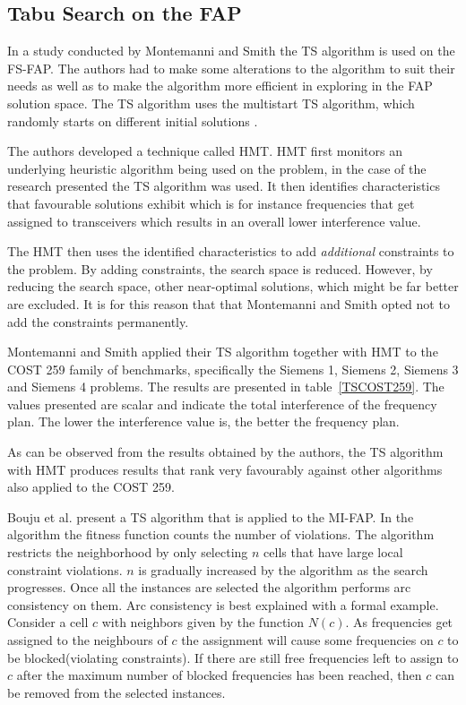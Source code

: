 \subsection{Tabu Search on the \gls{FAP}}
\label{sec:tabuonfap}
In a study conducted by Montemanni and Smith \cite{TabuMontemanniSmith} the \gls{TS} algorithm is used on the \gls{FS-FAP}. The authors had to make some alterations to the algorithm to suit their needs as well as to make the algorithm more efficient in exploring in the \gls{FAP} solution space. The \gls{TS} algorithm uses the multistart \gls{TS} algorithm, which randomly starts on different initial solutions \cite{TabuMontemanniSmith}.

The authors developed a technique called \gls{HMT}. \Gls{HMT} first monitors an underlying heuristic algorithm being used on the problem, in the case of the research presented the \gls{TS} algorithm was used\cite{TabuMontemanniSmith}. It then identifies characteristics that favourable solutions exhibit which is for instance frequencies that get assigned to transceivers which results in an overall lower interference value\cite{TabuMontemanniSmith}.

The \gls{HMT} then uses the identified characteristics to add \emph{additional} constraints to the problem\cite{TabuMontemanniSmith}. By adding constraints, the search space is reduced. However, by reducing the search space, other near-optimal solutions, which might be far better are excluded\cite{TabuMontemanniSmith}. It is for this reason that that Montemanni and Smith opted not to add the constraints permanently.

Montemanni and Smith applied their \gls{TS} algorithm together with \gls{HMT} to the \gls{COST} 259 family of benchmarks, specifically the Siemens 1, Siemens 2, Siemens 3 and Siemens 4 problems. The results are presented in table~\ref{TSCOST259}. The values presented are scalar and indicate the total interference of the frequency plan. The lower the interference value is, the better the frequency plan.

As can be observed from the results obtained by the authors, the \gls{TS} algorithm with HMT produces results that rank very favourably against other algorithms also applied to the \gls{COST} 259. 

Bouju et al. \cite{TSBouju} present a TS algorithm that is applied to the MI-FAP. In the algorithm the fitness function counts the number of violations. The algorithm restricts the neighborhood by only selecting $n$ cells that have large local constraint violations. $n$ is gradually increased by the algorithm as the search progresses. Once all the instances are selected the algorithm performs arc consistency on them. Arc consistency is best explained with a formal example. Consider a cell $c$ with neighbors given by the function $N(c)$. As frequencies get assigned to the neighbours of $c$ the assignment will cause some frequencies on $c$ to be blocked(violating constraints). If there are still free frequencies left to assign to $c$ after the maximum number of blocked frequencies has been reached, then $c$ can be removed from the selected instances.

